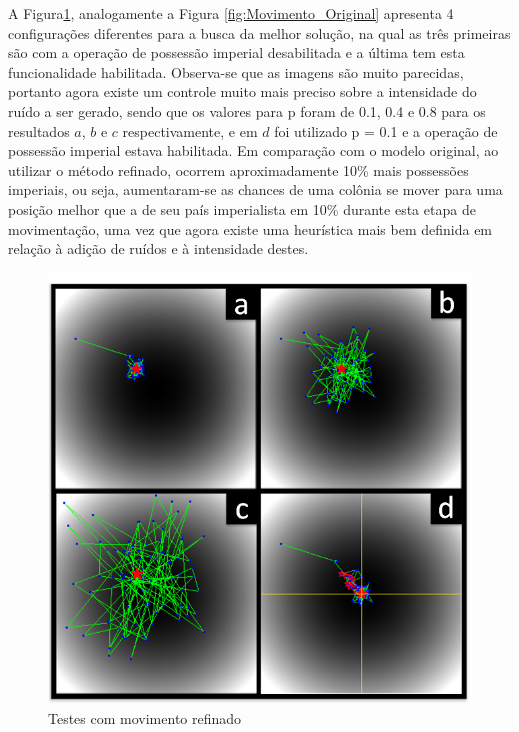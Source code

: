 A Figura\ref{fig:Movimento_Refinado}, analogamente a Figura \ref{fig:Movimento_Original}  apresenta 4 configurações diferentes para a busca da melhor solução, na qual as três primeiras são com a operação de possessão imperial desabilitada e a última tem esta funcionalidade habilitada. Observa-se que as imagens são muito parecidas, portanto agora existe um controle muito mais preciso sobre a intensidade  do ruído a ser gerado, sendo que os valores para p foram de 0.1, 0.4 e 0.8 para os resultados \(a\), \(b\) e \(c\) respectivamente, e em \(d\) foi utilizado p = 0.1 e a operação de possessão imperial estava habilitada. Em comparação com o modelo original, ao utilizar o método refinado, ocorrem aproximadamente 10\% mais possessões imperiais, ou seja, aumentaram-se as chances de uma colônia se mover para uma posição melhor que a de seu país imperialista em 10\% durante esta etapa de movimentação, uma vez que agora existe uma heurística mais bem definida em relação à adição de ruídos e à intensidade destes.

\begin{figure}[htp]
	\centering
	\includegraphics[scale=0.9]{Figuras/Movimento_Refinado.png}
	\caption{Testes com movimento refinado}
	\label{fig:Movimento_Refinado}
\end{figure}






